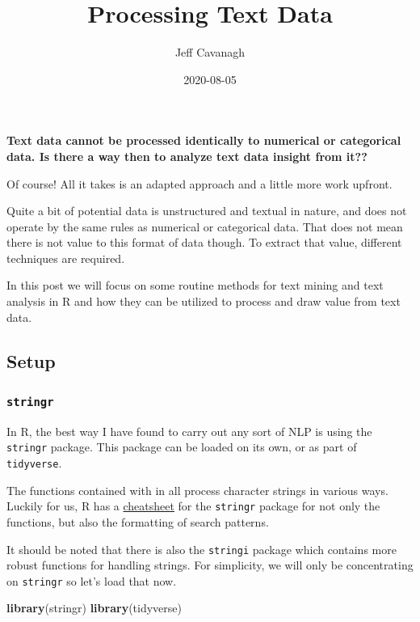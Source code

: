 \documentclass[]{article}
\title{Processing Text Data}
\author{Jeff Cavanagh}
\date{2020-08-05}
\newenvironment{Shaded}{\begin{snugshade}}{\end{snugshade}}
\newcommand{\KeywordTok}[1]{\textcolor[rgb]{0.13,0.29,0.53}{\textbf{#1}}}
\newcommand{\NormalTok}[1]{#1}
\begin{document}
\maketitle

\textbf{Text data cannot be processed identically to numerical or
categorical data. Is there a way then to analyze text data insight from
it??}

Of course! All it takes is an adapted approach and a little more work
upfront.

Quite a bit of potential data is unstructured and textual in nature, and
does not operate by the same rules as numerical or categorical data.
That does not mean there is not value to this format of data though. To
extract that value, different techniques are required.

In this post we will focus on some routine methods for text mining and
text analysis in R and how they can be utilized to process and draw
value from text data.

\hypertarget{setup}{%
\subsection{Setup}\label{setup}}

\hypertarget{stringr}{%
\subsubsection{\texorpdfstring{\texttt{stringr}}{stringr}}\label{stringr}}

In R, the best way I have found to carry out any sort of NLP is using
the \texttt{stringr} package. This package can be loaded on its own, or
as part of \texttt{tidyverse}.

The functions contained with in all process character strings in various
ways. Luckily for us, R has a
\href{/rcheatsheets/strings.pdf}{cheatsheet} for the \texttt{stringr}
package for not only the functions, but also the formatting of search
patterns.

It should be noted that there is also the \texttt{stringi} package which
contains more robust functions for handling strings. For simplicity, we
will only be concentrating on \texttt{stringr} so let's load that now.

\begin{Shaded}
\begin{Highlighting}[]
\KeywordTok{library}\NormalTok{(stringr)}
\KeywordTok{library}\NormalTok{(tidyverse)}
\end{Highlighting}
\end{Shaded}
\end{document}
